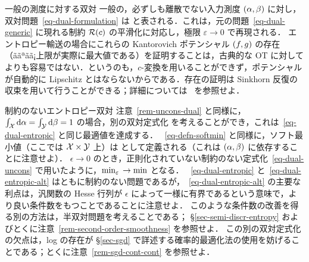 \begin{rem2}{一般の測度に対する双対}
一般の，必ずしも離散でない入力測度 $(\alpha,\beta)$ に対し，双対問題~\eqref{eq-dual-formulation} は
と表される．これは，元の問題~\eqref{eq-dual-generic} に現れる制約 $\mathcal{R}(c)$ の平滑化に対応し，極限 $\varepsilon \rightarrow 0$ で再現される．
%
エントロピー輸送の場合にこれらの Kantorovich ポテンシャル $(f,g)$ の存在（ããªãã¡上限が実際に最大値である）を証明することは，古典的な OT に対してよりも容易ではない．というのも，$c$-変換を用いることができず，ポテンシャルが自動的に Lipschitz とはならないからである．存在の証明は Sinkhorn 反復の収束を用いて行うことができる；詳細については~\citep{2016-chizat-sinkhorn} を参照せよ．
\end{rem2}




\begin{rem2}{制約のないエントロピー双対}
注意~\ref{rem-uncons-dual} と同様に，$\int_{\mathcal{X}} \mathrm{d}\alpha=\int_{\mathcal{Y}}\mathrm{d}\beta = 1$ の場合，別の双対定式化
を考えることができ，これは~\eqref{eq-dual-entropic} と同じ最適値を達成する．
%
~\eqref{eq-defn-softmin} と同様に，ソフト最小値（ここでは $\mathcal{X} \times \mathcal{Y}$ 上）は
として定義される（これは $(\alpha,\beta)$ に依存することに注意せよ）．
%
$\epsilon \rightarrow 0$ のとき，正則化されていない制約のない定式化~\eqref{eq-dual-uncons} で用いたように，$\text{min}_\varepsilon\, \rightarrow \min$ となる．
%
~\eqref{eq-dual-entropic} と~\eqref{eq-dual-entropic-alt} はともに制約のない問題であるが，~\eqref{eq-dual-entropic-alt} の主要な利点は，汎関数の Hesse 行列が $\epsilon$ によって一様に有界であるという意味で，より良い条件数をもつことであることに注意せよ．
このような条件数の改善を得る別の方法は，半双対問題を考えることである；
\S\ref{sec-semi-discr-entropy} およびとくに注意~\ref{rem-second-order-smoothness} を参照せよ．
%
この別の双対定式化の欠点は，log の存在が \S\ref{sec-sgd} で詳述する確率的最適化法の使用を妨げることである；とくに注意~\ref{rem-sgd-cont-cont} を参照せよ．
\end{rem2}

